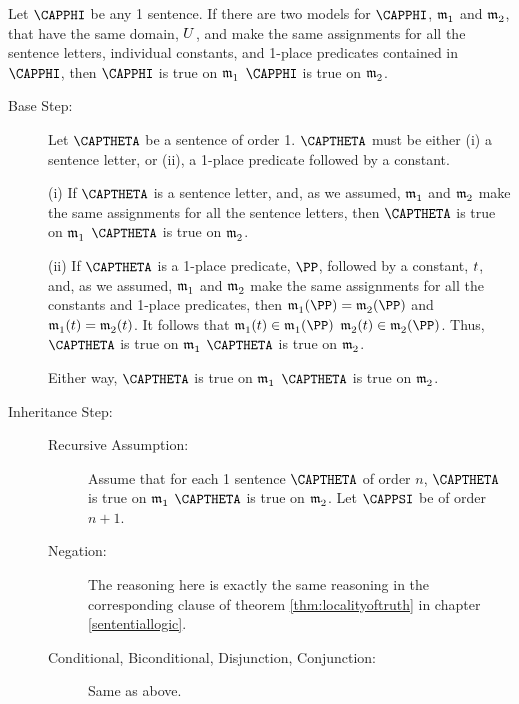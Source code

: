 \begin{THEOREM}{} 
	Let $\CAPPHI$ be any \GQL{}1 sentence.  If there are two models for $\CAPPHI$, $\mathfrak{m^{\mathrm{}}_{\mathrm{1}}}$ and $\mathfrak{m^{\mathrm{}}_{\mathrm{2}}}$, that have the same domain, $U$, and make the same assignments for all the sentence letters, individual constants, and 1-place predicates contained in $\CAPPHI$, then $\CAPPHI$ is true on $\mathfrak{m^{\mathrm{}}_{\mathrm{1}}}$ \Iff $\CAPPHI$ is true on $\mathfrak{m^{\mathrm{}}_{\mathrm{2}}}$.
\end{THEOREM}	
\begin{PROOF}
	\begin{description}
		\item[Base Step:]  Let $\CAPTHETA$ be a sentence of order 1.  $\CAPTHETA$ must be either (i) a sentence letter, or (ii), a 1-place predicate followed by a constant.
		
		(i) If $\CAPTHETA$ is a sentence letter, and, as we assumed, $\mathfrak{m^{\mathrm{}}_{\mathrm{1}}}$ and $\mathfrak{m^{\mathrm{}}_{\mathrm{2}}}$ make the same assignments for all the sentence letters, then $\CAPTHETA$ is true on $\mathfrak{m^{\mathrm{}}_{\mathrm{1}}}$ \Iff $\CAPTHETA$ is true on $\mathfrak{m^{\mathrm{}}_{\mathrm{2}}}$.
		
		(ii) If $\CAPTHETA$ is a 1-place predicate, $\PP$, followed by a constant, $t$, and, as we assumed, $\mathfrak{m^{\mathrm{}}_{\mathrm{1}}}$ and $\mathfrak{m^{\mathrm{}}_{\mathrm{2}}}$ make the same assignments for all the constants and 1-place predicates, then $\As{}{1}(\PP)=\As{}{2}(\PP)$ and $\mathfrak{m^{\mathrm{}}_{\mathrm{1}}}(t)=\mathfrak{m^{\mathrm{}}_{\mathrm{2}}}(t)$.  It follows that $\As{}{1}(\variable{t})\in\As{}{1}(\PP)$ \Iff $\As{}{2}(\variable{t})\in\As{}{2}(\PP)$.  Thus, $\CAPTHETA$ is true on $\mathfrak{m^{\mathrm{}}_{\mathrm{1}}}$ \Iff $\CAPTHETA$ is true on $\mathfrak{m^{\mathrm{}}_{\mathrm{2}}}$.
		
		Either way, $\CAPTHETA$ is true on $\mathfrak{m^{\mathrm{}}_{\mathrm{1}}}$ \Iff $\CAPTHETA$ is true on $\mathfrak{m^{\mathrm{}}_{\mathrm{2}}}$.
		
		\item[Inheritance Step:] 
		\begin{description}
			\item[Recursive Assumption:] Assume that for each \GQL{}1 sentence $\CAPTHETA$ of order $n$, $\CAPTHETA$ is true on $\mathfrak{m^{\mathrm{}}_{\mathrm{1}}}$ \Iff $\CAPTHETA$ is true on $\mathfrak{m^{\mathrm{}}_{\mathrm{2}}}$.  Let $\CAPPSI$ be of order $n+1$.
			
			\item[Negation:]  The reasoning here is exactly the same reasoning in the corresponding clause of theorem \ref{thm:localityoftruth} in chapter \ref{sententiallogic}.
			
			\item[Conditional, Biconditional, Disjunction, Conjunction:] Same as above.
			

\end{description}
\end{description}
\end{PROOF}
